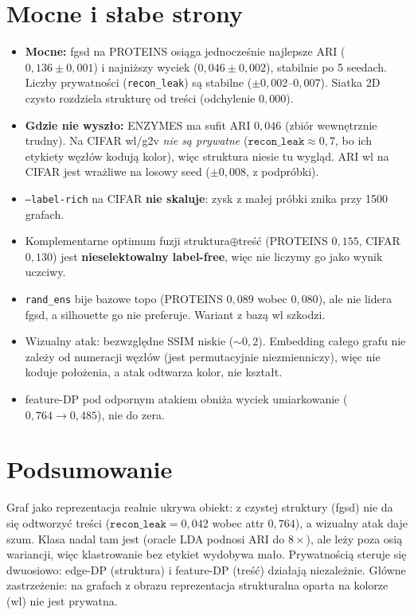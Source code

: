 \documentclass[11pt,a4paper]{article}
\newcommand{\rl}{\texttt{recon\_leak}}
\begin{document}
\section{Mocne i s\l abe strony}
\begin{itemize}
\item \textbf{Mocne:} fgsd na PROTEINS osi\k{a}ga jednocze\'snie najlepsze ARI ($0{,}136\pm0{,}001$)
i najni\.zszy wyciek ($0{,}046\pm0{,}002$), stabilnie po 5 seedach. Liczby prywatno\'sci (\rl) s\k{a}
stabilne ($\pm0{,}002$--$0{,}007$). Siatka 2D czysto rozdziela struktur\k{e} od tre\'sci (odchylenie $0{,}000$).
\item \textbf{Gdzie nie wysz\l o:} ENZYMES ma sufit ARI $0{,}046$ (zbi\'or wewn\k{e}trznie trudny).
Na CIFAR wl/g2v \emph{nie s\k{a} prywatne} ($\rl\approx0{,}7$, bo ich etykiety w\k{e}z\l\'ow koduj\k{a}
kolor), wi\k{e}c struktura niesie tu wygl\k{a}d. ARI wl na CIFAR jest wra\.zliwe na losowy seed
($\pm0{,}008$, z podpr\'obki).
\item \texttt{--label-rich} na CIFAR \textbf{nie skaluje}: zysk z ma\l ej pr\'obki znika przy 1500 grafach.
\item Komplementarne optimum fuzji struktura$\oplus$tre\'s\'c (PROTEINS $0{,}155$, CIFAR $0{,}130$)
jest \textbf{nieselektowalny label-free}, wi\k{e}c nie liczymy go jako wynik uczciwy.
\item \texttt{rand\_ens} bije bazowe topo (PROTEINS $0{,}089$ wobec $0{,}080$), ale nie lidera fgsd,
a silhouette go nie preferuje. Wariant z baz\k{a} wl szkodzi.
\item Wizualny atak: bezwzgl\k{e}dne SSIM niskie ($\sim0{,}2$). Embedding ca\l ego grafu nie zale\.zy
od numeracji w\k{e}z\l\'ow (jest permutacyjnie niezmienniczy), wi\k{e}c nie koduje po\l o\.zenia, a
atak odtwarza kolor, nie kszta\l t.
\item feature-DP pod odpornym atakiem obni\.za wyciek umiarkowanie ($0{,}764\to0{,}485$), nie do zera.
\end{itemize}

\section{Podsumowanie}
Graf jako reprezentacja realnie ukrywa obiekt: z czystej struktury (fgsd) nie da si\k{e}
odtworzy\'c tre\'sci ($\rl=0{,}042$ wobec attr $0{,}764$), a wizualny atak daje szum. Klasa nadal
tam jest (oracle LDA podnosi ARI do $8\times$), ale le\.zy poza osi\k{a} wariancji, wi\k{e}c
klastrowanie bez etykiet wydobywa ma\l o. Prywatno\'sci\k{a} steruje si\k{e} dwuosiowo: edge-DP
(struktura) i feature-DP (tre\'s\'c) dzia\l aj\k{a} niezale\.znie. G\l\'owne zastrze\.zenie: na
grafach z obrazu reprezentacja strukturalna oparta na kolorze (wl) nie jest prywatna.
\end{document}
